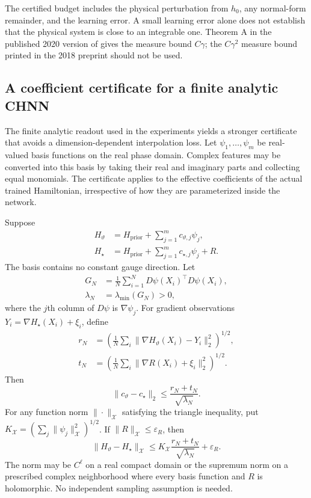 The certified budget includes the physical perturbation from $h_0$, any
normal-form remainder, and the learning error. A small learning error alone
does not establish that the physical system is close to an integrable one.
Theorem A in the published 2020 version of \citet{bounemoura} gives
the measure bound $C\gamma$; the $C\gamma^2$ measure bound printed in the
2018 preprint should not be used.

\subsection{A coefficient certificate for a finite analytic CHNN}
\label{sec:coefficient-certificate}

The finite analytic readout used in the experiments yields a stronger certificate
that avoids a dimension-dependent interpolation loss. Let $\psi_1,\ldots,
\psi_m$ be real-valued basis functions on the real phase domain. Complex
features may be converted into this basis by taking their real and imaginary
parts and collecting equal monomials. The certificate applies to the effective
coefficients of the actual trained Hamiltonian, irrespective of how they are
parameterized inside the network.

\begin{proposition}
\label{prop:gram-certificate}
Suppose
\begin{align*}
 H_\vartheta&=H_{\mathrm{prior}}+\sum_{j=1}^m c_{\vartheta,j}\psi_j,\\
 H_\star&=H_{\mathrm{prior}}+\sum_{j=1}^m c_{\star,j}\psi_j+R.
\end{align*}
The basis contains no constant gauge direction. Let
\begin{align*}
 G_N&=\frac1N\sum_{i=1}^N D\psi(X_i)^\top D\psi(X_i),\\
 \lambda_N&=\lambda_{\min}(G_N)>0,
\end{align*}
where the $j$th column of $D\psi$ is $\nabla\psi_j$.
For gradient observations $Y_i=\nabla H_\star(X_i)+\xi_i$, define
\begin{align*}
 r_N&=\left(\frac1N\sum_i\|\nabla H_\vartheta(X_i)-Y_i\|_2^2\right)^{1/2},\\
 t_N&=\left(\frac1N\sum_i\|\nabla R(X_i)+\xi_i\|_2^2\right)^{1/2}.
\end{align*}
Then
\begin{equation}
 \|c_\vartheta-c_\star\|_2\leq\frac{r_N+t_N}{\sqrt{\lambda_N}}.
 \label{eq:coefficient-error}
\end{equation}
For any function norm $\|\cdot\|_{\mathcal X}$ satisfying the triangle
inequality, put $K_{\mathcal X}=(\sum_j\|\psi_j\|_{\mathcal X}^2)^{1/2}$.
If $\|R\|_{\mathcal X}\leq\varepsilon_R$, then
\begin{equation}
 \|H_\vartheta-H_\star\|_{\mathcal X}
 \leq K_{\mathcal X}\frac{r_N+t_N}{\sqrt{\lambda_N}}+\varepsilon_R.
 \label{eq:global-coefficient-certificate}
\end{equation}
The norm may be $C^\ell$ on a real compact domain or the supremum norm on
a prescribed complex neighborhood where every basis function and $R$ is
holomorphic. No independent sampling assumption is needed.
\end{proposition}

